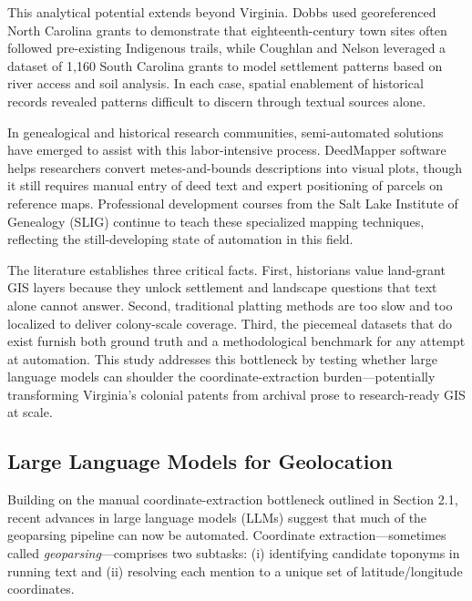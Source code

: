 This analytical potential extends beyond Virginia. Dobbs
\citep{Dobbs2009_backcountry} used georeferenced North Carolina grants
to demonstrate that eighteenth-century town sites often followed
pre-existing Indigenous trails, while Coughlan and Nelson
\citep{Coughlan2018_settlement} leveraged a dataset of 1,160 South
Carolina grants to model settlement patterns based on river access and
soil analysis. In each case, spatial enablement of historical records
revealed patterns difficult to discern through textual sources alone.

In genealogical and historical research communities, semi-automated
solutions have emerged to assist with this labor-intensive process.
DeedMapper software \citep{DeedMapper_software} helps researchers
convert metes-and-bounds descriptions into visual plots, though it still
requires manual entry of deed text and expert positioning of parcels on
reference maps. Professional development courses from the Salt Lake
Institute of Genealogy (SLIG) continue to teach these specialized
mapping techniques, reflecting the still-developing state of automation
in this field.

The literature establishes three critical facts. First, historians value
land-grant GIS layers because they unlock settlement and landscape
questions that text alone cannot answer. Second, traditional platting
methods are too slow and too localized to deliver colony-scale coverage.
Third, the piecemeal datasets that do exist furnish both ground truth
and a methodological benchmark for any attempt at automation. This study
addresses this bottleneck by testing whether large language models can
shoulder the coordinate-extraction burden---potentially transforming
Virginia's colonial patents from archival prose to research-ready GIS at
scale.

\subsection{Large Language Models for
Geolocation}\label{large-language-models-for-geolocation}

Building on the manual coordinate-extraction bottleneck outlined in
Section 2.1, recent advances in large language models (LLMs) suggest
that much of the geoparsing pipeline can now be automated. Coordinate
extraction---sometimes called \emph{geoparsing}---comprises two
subtasks: (i) identifying candidate toponyms in running text and (ii)
resolving each mention to a unique set of latitude/longitude
coordinates.

